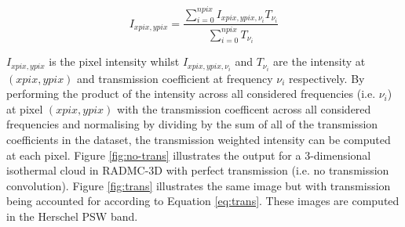 \documentclass{report}
\begin{document}
\begin{equation}
  I_{xpix,ypix} = \frac{\sum_{i=0}^{npix} I_{xpix,ypix,\nu_i} T_{\nu_i}}{\sum_{i=0}^{npix} T_{\nu_i}}
  \label{eq:trans}
\end{equation}

$I_{xpix,ypix}$ is the pixel intensity whilst $I_{xpix,ypix,\nu_i}$ and $T_{\nu_i}$ are the intensity at $(xpix,ypix)$ and transmission coefficient at frequency $\nu_i$ respectively.  By performing the product of the intensity across all considered frequencies (i.e. $\nu_i$) at pixel $(xpix,ypix)$ with the transmission coefficent across all considered frequencies and normalising by dividing by the sum of all of the transmission coefficients in the dataset, the transmission weighted intensity can be computed at each pixel. Figure \ref{fig:no-trans} illustrates the output for a 3-dimensional isothermal cloud in RADMC-3D with perfect transmission (i.e. no transmission convolution). Figure \ref{fig:trans} illustrates the same image but with transmission being accounted for according to Equation \ref{eq:trans}. These images are computed in the Herschel PSW band.
\end{document}
